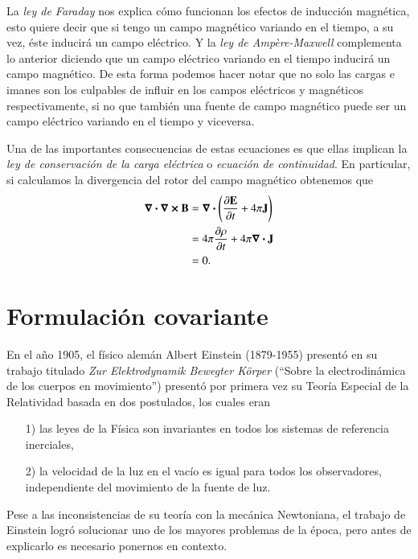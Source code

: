 La \textit{ley de Faraday} nos explica cómo funcionan los efectos de inducción magnética, esto quiere decir que si tengo un campo magnético variando en el tiempo, a su vez, éste inducirá un campo eléctrico.  Y la \textit{ley de Ampère-Maxwell} complementa lo anterior diciendo que un campo eléctrico variando en el tiempo inducirá un campo magnético. De esta forma podemos hacer notar que no solo las cargas e imanes son los culpables de influir en los campos eléctricos y magnéticos respectivamente, si no que también una fuente de campo magnético puede ser un campo eléctrico variando en el tiempo y viceversa.

Una de las importantes consecuencias de estas ecuaciones es que ellas implican la \textit{ley de conservación de la carga eléctrica} o \textit{ecuación de continuidad}. En particular, si calculamos la divergencia del rotor del campo magnético obtenemos que
\begin{align}
\div{\curl{\vb{B}}} &= \div{ \left( \pdv{\vb{E}}{t} + 4\pi \vb{J} \right) }\\
&= 4\pi \pdv{\rho}{t} + 4\pi \div{\vb{J}}\\
&= 0.
\end{align}

\section{Formulación covariante}

En el año 1905, el físico alemán Albert Einstein (1879-1955) presentó en su trabajo titulado \textit{Zur Elektrodynamik Bewegter Körper} \cite{Einstein} (``Sobre la electrodinámica de los cuerpos en movimiento'') presentó por primera vez su Teoría Especial de la Relatividad basada en dos postulados, los cuales eran
\begin{itemize}
\item[1)] las leyes de la Física son invariantes en todos los sistemas de referencia inerciales,
\item[2)] la velocidad de la luz en el vacío es igual para todos los observadores, independiente del movimiento de la fuente de luz.
\end{itemize}

Pese a las inconsistencias de su teoría con la mecánica Newtoniana, el trabajo de Einstein logró solucionar uno de los mayores problemas de la época, pero antes de explicarlo es necesario ponernos en contexto.

